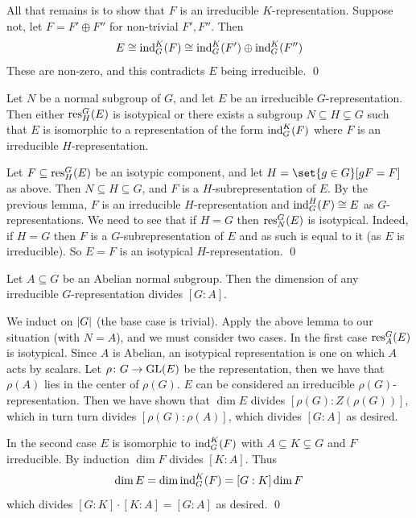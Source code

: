     All that remains is to show that $F$ is an irreducible $K$-representation.
    Suppose not, let $F=F'\oplus F''$ for non-trivial $F',F''$.
    Then
    $$ E \cong {\rm ind}^K_G(F) \cong {\rm ind}^K_G(F')\oplus{\rm ind}^K_G(F'') $$
    These are non-zero, and this contradicts $E$ being irreducible.
    \qed

\eproof

\blemm

    Let $N$ be a normal subgroup of $G$, and let $E$ be an irreducible $G$-representation.
    Then either ${\rm res}^G_H(E)$ is isotypical or there exists a subgroup $N\subseteq H\subsetneq G$ such that $E$ is isomorphic to a representation of the form ${\rm ind}^K_G(F)$ where $F$
    is an irreducible $H$-representation.

\elemm

\bproof

    Let $F\subseteq{\rm res}^G_H(E)$ be an isotypic component, and let $H=\set{g\in G}[gF=F]$ as above.
    Then $N\subseteq H\subseteq G$, and $F$ is a $H$-subrepresentation of $E$.
    By the previous lemma, $F$ is an irreducible $H$-representation and ${\rm ind}^H_G(F)\cong E$ as $G$-representations.
    We need to see that if $H=G$ then ${\rm res}^G_N(E)$ is isotypical.
    Indeed, if $H=G$ then $F$ is a $G$-subrepresentation of $E$ and as such is equal to it (as $E$ is irreducible).
    So $E=F$ is an isotypical $H$-representation.
    \qed

\eproof

\bthrm

    Let $A\subseteq G$ be an Abelian normal subgroup.
    Then the dimension of any irreducible $G$-representation divides $[G:A]$.

\ethrm

\bproof

    We induct on $\mathopen{}\mathclose{\left|G\right|}$ (the base case is trivial).
    Apply the above lemma to our situation (with $N=A$), and we must consider two cases.
    In the first case ${\rm res}^G_A(E)$ is isotypical.
    Since $A$ is Abelian, an isotypical representation is one on which $A$ acts by scalars.
    Let $\rho\colon G\to{\rm GL}(E)$ be the representation, then we have that $\rho(A)$ lies in the center of $\rho(G)$.
    $E$ can be considered an irreducible $\rho(G)$-representation.
    Then we have shown that $\dim E$ divides $[\rho(G):Z(\rho(G))]$, which in turn turn divides $[\rho(G):\rho(A)]$, which divides $[G:A]$ as desired.

    In the second case $E$ is isomorphic to ${\rm ind}^K_G(F)$ with $A\subseteq K\subsetneq G$ and $F$ irreducible.
    By induction $\dim F$ divides $[K:A]$.
    Thus
    $$ \dim E = \dim{\rm ind}^K_G(F) = [G:K]\dim F $$
    which divides $[G:K]\cdot[K:A]=[G:A]$ as desired.
    \qed

